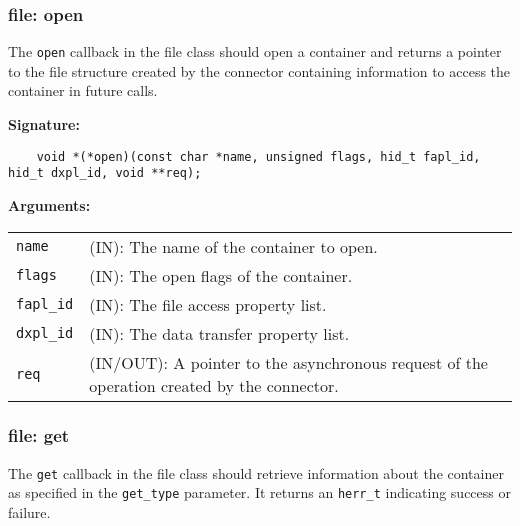 \hspace*{\fill}

\subsubsection{file: open}
The \texttt{open} callback in the file class should open a container and
returns a pointer to the file structure created by the connector containing information to
access the container in future calls.\bigskip

\begin{mdframed}[style=bgbox] 
\textbf{Signature:}
\begin{lstlisting}
    void *(*open)(const char *name, unsigned flags, hid_t fapl_id, hid_t dxpl_id, void **req);
\end{lstlisting}

\textbf{Arguments:}\\
\begin{tabular}{l p{13.5cm}}
  \texttt{name} & (IN): The name of the container to open.\\
  \texttt{flags} & (IN): The open flags of the container.\\
  \texttt{fapl\_id} & (IN): The file access property list.\\
  \texttt{dxpl\_id} & (IN): The data transfer property list.\\
  \texttt{req} & (IN/OUT): A pointer to the asynchronous request of the
  operation created by the connector.\\
\end{tabular}
\end{mdframed}

\subsubsection{file: get}
The \texttt{get} callback in the file class should retrieve
information about the container as specified in the \texttt{get\_type}
parameter. It returns an \texttt{herr\_t} indicating success or failure.\bigskip

